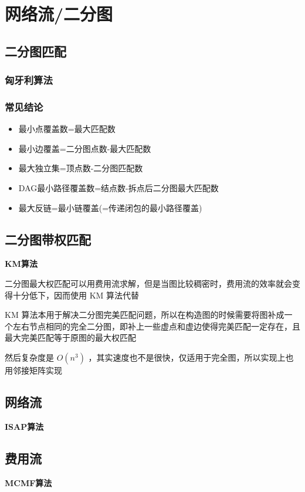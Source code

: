 %
%
	\newpage
	\section{网络流/二分图}
	\subsection{二分图匹配}
	\subsubsection{匈牙利算法}
	
	\subsubsection{常见结论}
	\begin{itemize}
		\item 最小点覆盖数=最大匹配数
		\item 最小边覆盖=二分图点数-最大匹配数
		\item 最大独立集=顶点数-二分图匹配数
		\item DAG最小路径覆盖数=结点数-拆点后二分图最大匹配数
		\item 最大反链=最小链覆盖(=传递闭包的最小路径覆盖)
	\end{itemize}
	\newpage
	\subsection{二分图带权匹配}
	\textbf {\large KM算法}
	
	二分图最大权匹配可以用费用流求解，但是当图比较稠密时，费用流的效率就会变得十分低下，因而使用 KM 算法代替
	
	KM 算法本用于解决二分图完美匹配问题，所以在构造图的时候需要将图补成一个左右节点相同的完全二分图，即补上一些虚点和虚边使得完美匹配一定存在，且最大完美匹配等于原图的最大权匹配
	
	然后复杂度是 $O(n^3)$ ，其实速度也不是很快，仅适用于完全图，所以实现上也用邻接矩阵实现\\
	
	\newpage
	\subsection{网络流}
	\textbf{\large ISAP算法}\\
	
	\newpage
	\subsection{费用流}
	\textbf{\large MCMF算法}\\
	
	\newpage
